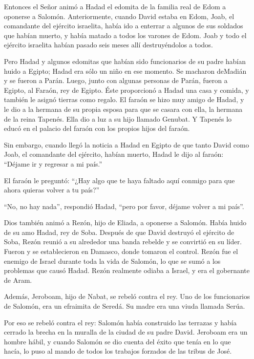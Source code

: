  Entonces el Señor animó a Hadad el edomita de la familia
real de Edom a oponerse a Salomón.  Anteriormente, cuando
David estaba en Edom, Joab, el comandante del ejército israelita, había
ido a enterrar a algunos de sus soldados que habían muerto, y había
matado a todos los varones de Edom.  Joab y todo el
ejército israelita habían pasado seis meses allí destruyéndolos a todos.

 Pero Hadad y algunos edomitas que habían sido funcionarios
de su padre habían huido a Egipto; Hadad era sólo un niño en ese
momento.  Se macharon deMadián y se fueron a Parán. Luego,
junto con algunas personas de Parán, fueron a Egipto, al Faraón, rey de
Egipto. Éste proporcionó a Hadad una casa y comida, y también le asignó
tierras como regalo.  El faraón se hizo muy amigo de Hadad,
y le dio a la hermana de su propia esposa para que se casara con ella,
la hermana de la reina Tapenés.  Ella dio a luz a su hijo
llamado Genubat. Y Tapenés lo educó en el palacio del faraón con los
propios hijos del faraón.

 Sin embargo, cuando llegó la noticia a Hadad en Egipto de
que tanto David como Joab, el comandante del ejército, habían muerto,
Hadad le dijo al faraón: ``Déjame ir y regresar a mi país.''

 El faraón le preguntó: ``¿Hay algo que te haya faltado
aquí conmigo para que ahora quieras volver a tu país?''

``No, no hay nada'', respondió Hadad, ``pero por favor, déjame volver a
mi país''.

 Dios también animó a Rezón, hijo de Eliada, a oponerse a
Salomón. Había huido de su amo Hadad, rey de Soba. Después de que David
destruyó el ejército de Soba,  Rezón reunió a su alrededor
una banda rebelde y se convirtió en su líder. Fueron y se establecieron
en Damasco, donde tomaron el control.  Rezón fue el enemigo
de Israel durante toda la vida de Salomón, lo que se sumó a los
problemas que causó Hadad. Rezón realmente odiaba a Israel, y era el
gobernante de Aram.

 Además, Jeroboam, hijo de Nabat, se rebeló contra el rey.
Uno de los funcionarios de Salomón, era un efraimita de Seredá. Su madre
era una viuda llamada Serúa.

 Por eso se rebeló contra el rey: Salomón había construido
las terrazas y había cerrado la brecha en la muralla de la ciudad de su
padre David.  Jeroboam era un hombre hábil, y cuando
Salomón se dio cuenta del éxito que tenía en lo que hacía, lo puso al
mando de todos los trabajos forzados de las tribus de José.

